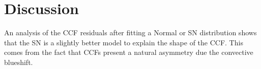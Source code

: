 \documentclass[11pt, oneside]{article}
\begin{document}


\section{Discussion} \label{sec:discu}

An analysis of the CCF residuals after fitting a Normal or SN distribution shows that the SN is a slightly better model to explain the shape of the CCF. This comes from the fact that CCFs present a natural asymmetry due the convective blueshift.
\end{document}
